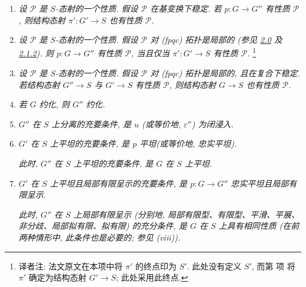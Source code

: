 \begin{enumerate}
\item[\textup{(vi)}]\label{concl:sga3-VIB-9.2-vi}
  \emph{设 \(\mathscr P\) 是 \(S\)-态射的一个性质.
  假设 \(\mathscr P\) 在基变换下稳定.
  若 \(p:G\to G''\) 有性质 \(\mathscr P\),
  则结构态射 \(\pi':G'\to S\) 也有性质 \(\mathscr P\).}

\item[\textup{(vii)}]\label{concl:sga3-VIB-9.2-vii}
  \emph{设 \(\mathscr P\) 是 \(S\)-态射的一个性质.
  假设 \(\mathscr P\) 对 \textup{(fpqc)} 拓扑是局部的
  \textup{(参见 \hyperref[par:sga3-VIB-2.0]{2.0} 及
  \hyperref[rem:sga3-VIB-2.1.2]{2.1.2})}.
  则 \(p:G\to G''\) 有性质 \(\mathscr P\),
  当且仅当 \(\pi':G'\to S\) 有性质 \(\mathscr P\).}%
  \begingroup
  \renewcommand{\thefootnote}{\fnsymbol{footnote}}%
  \footnote[1]{\label{note:sga3-VIB-9.2-vii-base}
  译者注: 法文原文在本项中将 \(\pi'\) 的终点印为 \(S'\).
  此处没有定义 \(S'\), 而第
  \textup{} 项
  将 \(\pi'\) 确定为结构态射 \(G'\to S\); 此处采用此终点.}%
  \endgroup

\item[\textup{(viii)}]\label{concl:sga3-VIB-9.2-viii}
  \emph{设 \(\mathscr P\) 是 \(S\)-态射的一个性质.
  假设 \(\mathscr P\) 对 \textup{(fpqc)} 拓扑是局部的,
  且在复合下稳定.
  若结构态射 \(G''\to S\) 与 \(G'\to S\) 有性质 \(\mathscr P\),
  则结构态射 \(G\to S\) 也有性质 \(\mathscr P\).}

\item[\textup{(ix)}]\label{concl:sga3-VIB-9.2-ix}
  \emph{若 \(G\) 约化, 则 \(G''\) 约化.}

\item[\textup{(x)}]\label{concl:sga3-VIB-9.2-x}
  \emph{\(G''\) 在 \(S\) 上分离的充要条件,
  是 \(u\) \textup{(或等价地, \(\varepsilon''\))} 为闭浸入.}

\item[\textup{(xi)}]\label{concl:sga3-VIB-9.2-xi}
  \emph{\(G'\) 在 \(S\) 上平坦的充要条件,
  是 \(p\) 平坦\textup{(或等价地, 忠实平坦)}.}

  \emph{此时, \(G''\) 在 \(S\) 上平坦的充要条件,
  是 \(G\) 在 \(S\) 上平坦.}

\item[\textup{(xii)}]\label{concl:sga3-VIB-9.2-xii}
  \emph{\(G'\) 在 \(S\) 上平坦且局部有限呈示的充要条件,
  是 \(p:G\to G''\) 忠实平坦且局部有限呈示.}

  \emph{此时, \(G''\) 在 \(S\) 上局部有限呈示
  \textup{(分别地, 局部有限型、有限型、平滑、平展、非分歧、局部拟有限、拟有限)}
  的充分条件, 是 \(G\) 在 \(S\) 上具有相同性质
  \textup{(在前两种情形中, 此条件也是必要的; 参见 \textup{(viii)})}.}


\end{enumerate}
